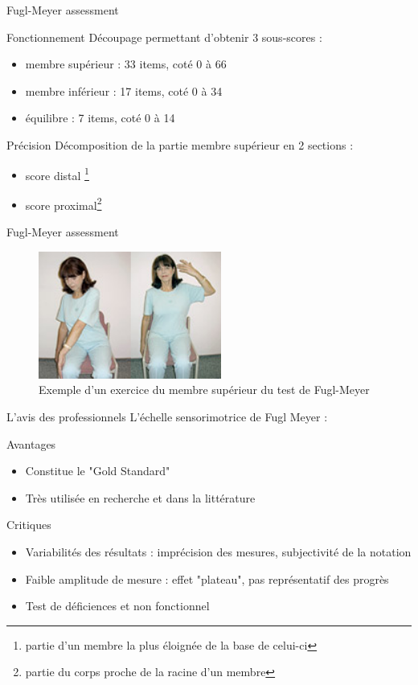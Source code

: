\begin{frame}{Fugl-Meyer assessment}
	\begin{block}{Fonctionnement}
		Découpage permettant d'obtenir 3 sous-scores : 
		\begin{itemize}
			\item membre supérieur : 33 items, coté 0 à 66
			\item membre inférieur : 17 items, coté 0 à 34
			\item équilibre : 7 items, coté 0 à 14
		\end{itemize}
	\end{block}  \pause
	\begin{block}{Précision}
		Décomposition de  la partie membre supérieur en 2 sections : 
		\begin{itemize}
			\item score distal \footnote{partie d’un membre la plus éloignée de la base de celui-ci} 
			\item score proximal\footnote{partie du corps proche de la racine d’un membre}
		\end{itemize}
	\end{block}	
\end{frame}

\begin{frame}{Fugl-Meyer assessment}
	\begin{figure}
	\centering
	\includegraphics[width=6cm]{../images/fuglmeyer_example.png}
	\caption{Exemple d’un exercice du membre supérieur du test de Fugl-Meyer}
	\end{figure}
\end{frame}

\begin{frame}{L'avis des professionnels}
L'échelle sensorimotrice de Fugl Meyer :
	\begin{exampleblock}{Avantages}
			\begin{itemize}
			\item Constitue le "Gold Standard"  \pause
			\item Très utilisée en recherche et dans la littérature 
		\end{itemize}  \pause
	\end{exampleblock}
	\begin{alertblock}{Critiques}
			\begin{itemize}
			\item Variabilités des résultats : imprécision des mesures, subjectivité de la notation  \pause
			\item Faible amplitude de mesure : effet "plateau", pas représentatif des progrès   \pause
			\item Test de déficiences et non fonctionnel
		\end{itemize}
	\end{alertblock}	
\end{frame}